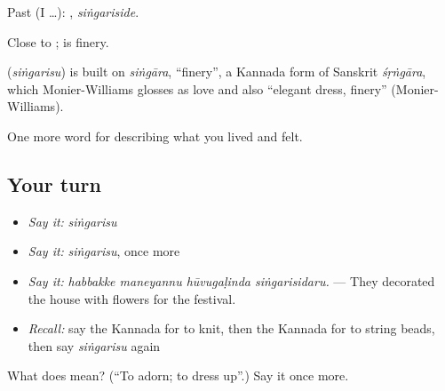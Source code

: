 Past (I …): , \emph{siṅgariside}.

Close to ;  is finery.

\begin{cousinweb}
\textbf{} (\emph{siṅgarisu}) is built on \emph{siṅgāra}, \textquotedblleft{}finery\textquotedblright{}, a Kannada form of Sanskrit \emph{śṛṅgāra}, which Monier-Williams glosses as love and also \textquotedblleft{}elegant dress, finery\textquotedblright{} (Monier-Williams).
\end{cousinweb}

\begin{grammarlens}[title={What you've built}]
One more word for describing what you lived and felt.
\end{grammarlens}

\subsection*{Your turn}
\begin{itemize}
\raggedright
  \item \emph{Say it:} \emph{siṅgarisu}
  \item \emph{Say it:} \emph{siṅgarisu}, once more
  \item \emph{Say it:} \emph{habbakke maneyannu hūvugaḷinda siṅgarisidaru.} — They decorated the house with flowers for the festival.
  \item \emph{Recall:} say the Kannada for to knit, then the Kannada for to string beads, then say \emph{siṅgarisu} again
\end{itemize}

\begin{tcolorbox}[breakable,colback=teal!4,colframe=teal!35!black,title={Before you move on}]
What does  mean? (\textquotedblleft{}To adorn; to dress up\textquotedblright{}.) Say it once more.
\end{tcolorbox}
